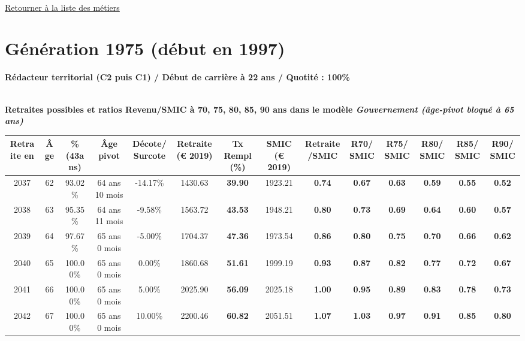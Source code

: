 ~\\ 
 
 \hyperlink{page.2}{\noindent Retourner à la liste des métiers}

 \newpage 

\section{Génération 1975 (début en 1997)\label{Redacteur_100_22_1975_0}} 
 
{\bf \noindent Rédacteur territorial (C2 puis C1) / Début de carrière à 22 ans / Quotité : 100\%}  ~ 

 ~\\{\bf \noindent Retraites possibles et ratios Revenu/SMIC à 70, 75, 80, 85, 90 ans dans le modèle \emph{Gouvernement (âge-pivot bloqué à 65 ans)}}  
 
\begin{adjustbox}{max width=\textwidth} 
\begin{tabular}[htb]{|c|c||c|c|c||c|c||c|c||c|c|c|c|c|} 
\hline 
 Retraite en &  Âge &  \%(43ans) &  Âge pivot &  Décote/Surcote &  Retraite (\euro{} 2019) &  Tx Rempl(\%) &  SMIC (\euro{} 2019) &  Retraite/SMIC &  R70/SMIC &  R75/SMIC &  R80/SMIC &  R85/SMIC &  R90/SMIC \\ 
\hline \hline 
 2037 &  62 &  93.02\% &  64 ans 10 mois &  -14.17\% &  1430.63 &  {\bf 39.90} &  1923.21 &  {\bf {\color{red} 0.74}} &  {\bf {\color{red} 0.67}} &  {\bf {\color{red} 0.63}} &  {\bf {\color{red} 0.59}} &  {\bf {\color{red} 0.55}} &  {\bf {\color{red} 0.52}} \\ 
\hline 
 2038 &  63 &  95.35\% &  64 ans 11 mois &  -9.58\% &  1563.72 &  {\bf 43.53} &  1948.21 &  {\bf {\color{red} 0.80}} &  {\bf {\color{red} 0.73}} &  {\bf {\color{red} 0.69}} &  {\bf {\color{red} 0.64}} &  {\bf {\color{red} 0.60}} &  {\bf {\color{red} 0.57}} \\ 
\hline 
 2039 &  64 &  97.67\% &  65 ans 0 mois &  -5.00\% &  1704.37 &  {\bf 47.36} &  1973.54 &  {\bf {\color{red} 0.86}} &  {\bf {\color{red} 0.80}} &  {\bf {\color{red} 0.75}} &  {\bf {\color{red} 0.70}} &  {\bf {\color{red} 0.66}} &  {\bf {\color{red} 0.62}} \\ 
\hline 
 2040 &  65 &  100.00\% &  65 ans 0 mois &  0.00\% &  1860.68 &  {\bf 51.61} &  1999.19 &  {\bf {\color{red} 0.93}} &  {\bf {\color{red} 0.87}} &  {\bf {\color{red} 0.82}} &  {\bf {\color{red} 0.77}} &  {\bf {\color{red} 0.72}} &  {\bf {\color{red} 0.67}} \\ 
\hline 
 2041 &  66 &  100.00\% &  65 ans 0 mois &  5.00\% &  2025.90 &  {\bf 56.09} &  2025.18 &  {\bf 1.00} &  {\bf {\color{red} 0.95}} &  {\bf {\color{red} 0.89}} &  {\bf {\color{red} 0.83}} &  {\bf {\color{red} 0.78}} &  {\bf {\color{red} 0.73}} \\ 
\hline 
 2042 &  67 &  100.00\% &  65 ans 0 mois &  10.00\% &  2200.46 &  {\bf 60.82} &  2051.51 &  {\bf 1.07} &  {\bf 1.03} &  {\bf {\color{red} 0.97}} &  {\bf {\color{red} 0.91}} &  {\bf {\color{red} 0.85}} &  {\bf {\color{red} 0.80}} \\ 
\hline 
\hline 
\end{tabular} 
\end{adjustbox} 
 
